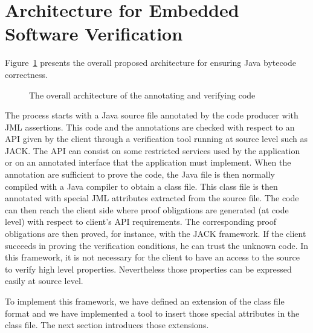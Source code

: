 \section{Architecture for Embedded Software Verification}\label{architecture_s}	
Figure~\ref{architecture} presents the overall proposed architecture for ensuring Java bytecode correctness. 
\begin{figure}[ht!]
\begin{center}
\caption{The overall architecture of the annotating and verifying code}
\label{architecture}
\end{center}
\end{figure}
The process starts with a Java source file annotated by the code producer with JML assertions. 
This code and the annotations are checked with respect to an API given by the client through a verification tool running at source level such as JACK.
The API can consist on some restricted services used by the application or on an annotated interface that the application must implement. 
When the annotation are sufficient to prove the code, the Java file is then normally compiled with a Java compiler to obtain a class file. 
This class file is then annotated with special JML attributes extracted from the source file. 
The code can then reach the client side where proof obligations are generated (at code level) with respect to client's API requirements. 
The corresponding proof obligations are then proved, for instance, with the JACK framework. If the client succeeds in proving the verification conditions, he can trust the unknown code. 
In this framework, it is not necessary for the client to have an access to the source to verify high level properties. 
Nevertheless those properties can be expressed easily at source level.

To implement this framework, we have defined an extension of the class file format and we have implemented a tool to insert those special attributes in the class file. The next section introduces those extensions.  

